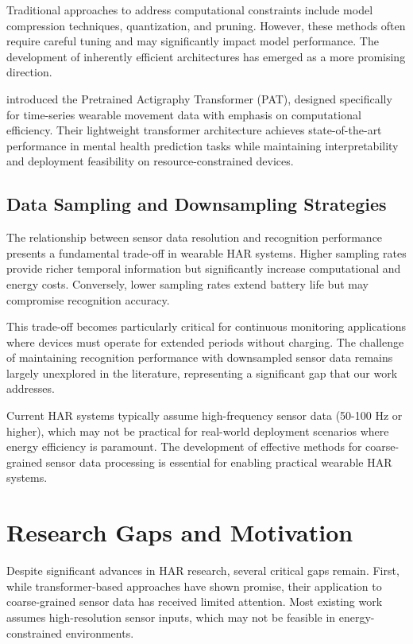 Traditional approaches to address computational constraints include model compression techniques, quantization, and pruning. However, these methods often require careful tuning and may significantly impact model performance. The development of inherently efficient architectures has emerged as a more promising direction.

\cite{Ruan2024PAT} introduced the Pretrained Actigraphy Transformer (PAT), designed specifically for time-series wearable movement data with emphasis on computational efficiency. Their lightweight transformer architecture achieves state-of-the-art performance in mental health prediction tasks while maintaining interpretability and deployment feasibility on resource-constrained devices.

\subsection{Data Sampling and Downsampling Strategies}

\hspace{2em}The relationship between sensor data resolution and recognition performance presents a fundamental trade-off in wearable HAR systems. Higher sampling rates provide richer temporal information but significantly increase computational and energy costs. Conversely, lower sampling rates extend battery life but may compromise recognition accuracy.

This trade-off becomes particularly critical for continuous monitoring applications where devices must operate for extended periods without charging. The challenge of maintaining recognition performance with downsampled sensor data remains largely unexplored in the literature, representing a significant gap that our work addresses.

Current HAR systems typically assume high-frequency sensor data (50-100 Hz or higher), which may not be practical for real-world deployment scenarios where energy efficiency is paramount. The development of effective methods for coarse-grained sensor data processing is essential for enabling practical wearable HAR systems.

\section{Research Gaps and Motivation}

\hspace{2em}Despite significant advances in HAR research, several critical gaps remain. First, while transformer-based approaches have shown promise, their application to coarse-grained sensor data has received limited attention. Most existing work assumes high-resolution sensor inputs, which may not be feasible in energy-constrained environments.

